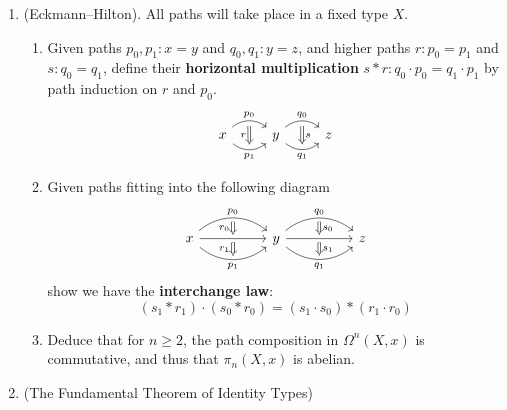 \documentclass[10pt,oneside,leqno,openright]{memoir}
\begin{document}
\begin{enumerate}
    \item (Eckmann--Hilton). All paths will take place in a fixed type $X$.
    \begin{enumerate}
        \item Given paths $p_0, p_1 : x = y$ and $q_0, q_1: y = z$, and higher paths $r : p_0 = p_1$ and $s : q_0 = q_1$, define their \textbf{horizontal multiplication} $s \ast r : q_0 \cdot p_0 = q_1 \cdot p_1$ by path induction on $r$ and $p_0$.
        \[\begin{tikzcd}
    	x & y & z
    	\arrow[""{name=0, anchor=center, inner sep=0}, "{p_1}"', bend right=40, from=1-1, to=1-2]
    	\arrow[""{name=1, anchor=center, inner sep=0}, "{q_1}"', bend right=40, from=1-2, to=1-3]
    	\arrow[""{name=2, anchor=center, inner sep=0}, "p_0", bend left=40, from=1-1, to=1-2]
    	\arrow[""{name=3, anchor=center, inner sep=0}, "q_0", bend left=40, from=1-2, to=1-3]
    	\arrow["s", shorten <=3pt, shorten >=3pt, Rightarrow, from=3, to=1]
    	\arrow["r"', shorten <=3pt, shorten >=3pt, Rightarrow, from=2, to=0]
        \end{tikzcd}\]

        \item Given paths fitting into the following diagram
    	\[\begin{tikzcd}
        x && y && z
        \arrow[""{name=0, anchor=center, inner sep=0}, "{p_1}"', bend right=40, from=1-1, to=1-3]
    	\arrow[""{name=1, anchor=center, inner sep=0}, "{q_1}"', bend right=40, from=1-3, to=1-5]
    	\arrow[""{name=2, anchor=center, inner sep=0}, "{p_0}", bend left=40, from=1-1, to=1-3]
    	\arrow[""{name=3, anchor=center, inner sep=0}, "{q_0}", bend left=40, from=1-3, to=1-5]
    	\arrow[""{name=4, anchor=center, inner sep=0}, from=1-1, to=1-3]
    	\arrow[""{name=5, anchor=center, inner sep=0}, from=1-3, to=1-5]
    	\arrow["{r_0}"', shorten <=2pt, shorten >=2pt, Rightarrow, from=2, to=4]
    	\arrow["{r_1}"', shorten <=2pt, shorten >=2pt, Rightarrow, from=4, to=0]
    	\arrow["{s_0}", shorten <=2pt, shorten >=2pt, Rightarrow, from=3, to=5]
    	\arrow["{s_1}", shorten <=2pt, shorten >=2pt, Rightarrow, from=5, to=1]
        \end{tikzcd}\]
        show we have the \textbf{interchange law}:
        \[ (s_1 \ast r_1) \cdot (s_0 \ast r_0) = (s_1 \cdot s_0) \ast (r_1 \cdot r_0)  \]

        \item Deduce that for $n \geq 2$, the path composition in $\Omega^n(X, x)$ is commutative, and thus that $\pi_n(X, x)$ is abelian.
    \end{enumerate}
    \item (The Fundamental Theorem of Identity Types)
    

\end{enumerate}
\end{document}
